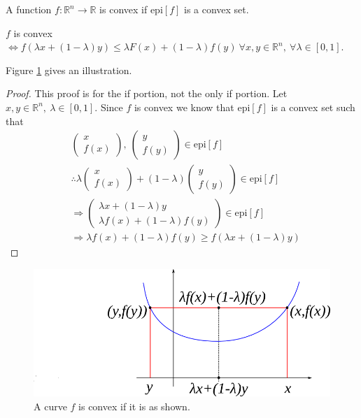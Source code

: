 \documentclass[lecture,12pt,]{pcms-l}
\theoremstyle{example}
\begin{document}
\begin{definition}
A function $f:\mathbb{R}^n\to\mathbb{R}$ is convex if $\text{epi}[f]$ is a convex set.
\end{definition}

\begin{theorem}
$f$ is convex $\Leftrightarrow f(\lambda x + (1-\lambda)y)\leq \lambda F(x) + (1-\lambda)f(y) ~\forall x,y\in\mathbb{R}^n, ~\forall \lambda\in[0,1]$.
\end{theorem}
Figure \ref{fig:05convexGeoProof} gives an illustration.
\begin{proof}
This proof is for the if portion, not the only if portion. Let $x,y\in\mathbb{R}^n, ~\lambda\in[0,1]$. Since $f$ is convex we know that $\text{epi}[f]$ is a convex set such that
\begin{align*}
&\left(\begin{array}{c} x \\ f(x) \end{array}\right), ~\left(\begin{array}{c} y \\ f(y) \end{array}\right) \in \text{epi}[f] \\
&\therefore \lambda\left(\begin{array}{c} x \\ f(x) \end{array}\right) + (1-\lambda)\left(\begin{array}{c} y \\ f(y) \end{array}\right) \in \text{epi}[f] \\
&\Rightarrow \left(\begin{array}{c} \lambda x+(1-\lambda)y \\ \lambda f(x) + (1-\lambda)f(y) \end{array}\right) \in \text{epi}[f] \\
&\Rightarrow \lambda f(x) + (1-\lambda)f(y) \geq f(\lambda x + (1-\lambda)y)
\end{align*}
\end{proof}

\begin{figure}[ht!]
	\centering
	\includegraphics[width=.5\textwidth]{images/05convexGeoProof}
	\caption{A curve $f$ is convex if it is as shown.}
	\label{fig:05convexGeoProof}
\end{figure}
\end{document}
